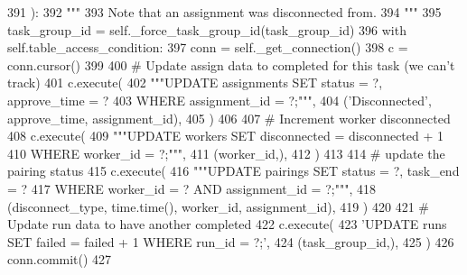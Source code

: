 \begin{DoxyCode}
391     ):
392         \textcolor{stringliteral}{"""}
393 \textcolor{stringliteral}{        Note that an assignment was disconnected from.}
394 \textcolor{stringliteral}{        """}
395         task\_group\_id = self.\_force\_task\_group\_id(task\_group\_id)
396         with self.table\_access\_condition:
397             conn = self.\_get\_connection()
398             c = conn.cursor()
399 
400             \textcolor{comment}{# Update assign data to completed for this task (we can't track)}
401             c.execute(
402                 \textcolor{stringliteral}{"""UPDATE assignments SET status = ?, approve\_time = ?}
403 \textcolor{stringliteral}{                         WHERE assignment\_id = ?;"""},
404                 (\textcolor{stringliteral}{'Disconnected'}, approve\_time, assignment\_id),
405             )
406 
407             \textcolor{comment}{# Increment worker disconnected}
408             c.execute(
409                 \textcolor{stringliteral}{"""UPDATE workers SET disconnected = disconnected + 1}
410 \textcolor{stringliteral}{                         WHERE worker\_id = ?;"""},
411                 (worker\_id,),
412             )
413 
414             \textcolor{comment}{# update the pairing status}
415             c.execute(
416                 \textcolor{stringliteral}{"""UPDATE pairings SET status = ?, task\_end = ?}
417 \textcolor{stringliteral}{                         WHERE worker\_id = ? AND assignment\_id = ?;"""},
418                 (disconnect\_type, time.time(), worker\_id, assignment\_id),
419             )
420 
421             \textcolor{comment}{# Update run data to have another completed}
422             c.execute(
423                 \textcolor{stringliteral}{'UPDATE runs SET failed = failed + 1 WHERE run\_id = ?;'},
424                 (task\_group\_id,),
425             )
426             conn.commit()
427 
\end{DoxyCode}
\mbox{\label{classparlai_1_1mturk_1_1core_1_1mturk__data__handler_1_1MTurkDataHandler_a9395320d0c2a2f00416acd381b5ae0ba}} 
